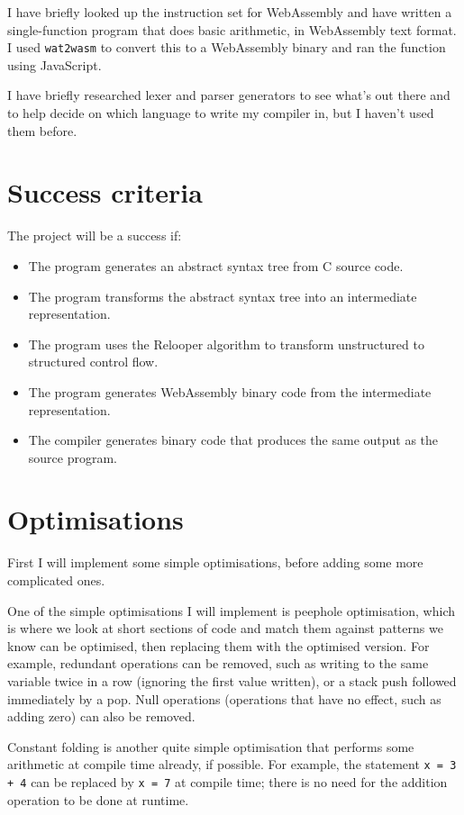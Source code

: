 \documentclass[12pt,a4paper]{article}
\begin{document}
I have briefly looked up the instruction set for WebAssembly and have written a single-function program that does basic arithmetic, in WebAssembly text format. I used \texttt{wat2wasm} to convert this to a WebAssembly binary and ran the function using JavaScript.

I have briefly researched lexer and parser generators to see what's out there and to help decide on which language to write my compiler in, but I haven't used them before.

\section*{Success criteria}

The project will be a success if:

\begin{itemize}
\item The program generates an abstract syntax tree from C source code.
\item The program transforms the abstract syntax tree into an intermediate representation.
\item The program uses the Relooper algorithm to transform unstructured to structured control flow.
\item The program generates WebAssembly binary code from the intermediate representation.
\item The compiler generates binary code that produces the same output as the source program.
\end{itemize}


\section*{Optimisations}

First I will implement some simple optimisations, before adding some more complicated ones.

One of the simple optimisations I will implement is peephole optimisation, which is where we look at short sections of code and match them against patterns we know can be optimised, then replacing them with the optimised version.
For example, redundant operations can be removed, such as writing to the same variable twice in a row (ignoring the first value written), or a stack push followed immediately by a pop.
Null operations (operations that have no effect, such as adding zero) can also be removed.

Constant folding is another quite simple optimisation that performs some arithmetic at compile time already, if possible. For example, the statement \texttt{x = 3 + 4} can be replaced by \texttt{x = 7} at compile time; there is no need for the addition operation to be done at runtime.
\end{document}
